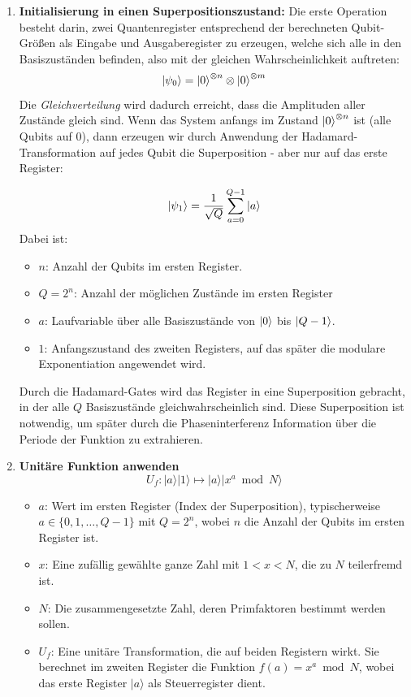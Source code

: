 \begin{enumerate}
    \item \textbf{Initialisierung in einen Superpositionszustand:} 
    Die erste Operation besteht darin, zwei Quantenregister entsprechend der berechneten Qubit-Größen als Eingabe und Ausgaberegister zu erzeugen, welche sich alle in den Basiszuständen befinden, also mit der gleichen Wahrscheinlichkeit auftreten:
\[
\ket{\psi_0} = \ket{0}^{\otimes n} \otimes \ket{0}^{\otimes m}
\]
    Die \textit{Gleichverteilung} wird dadurch erreicht, dass die Amplituden aller Zustände gleich sind. Wenn das System anfangs im Zustand $\ket{0}^{\otimes n}$ ist (alle Qubits auf 0), dann erzeugen wir durch Anwendung der Hadamard-Transformation auf jedes Qubit die Superposition - aber nur auf das erste Register:

$$
\ket{\psi_1} = \frac{1}{\sqrt{Q}} \sum_{a=0}^{Q-1} \ket{a}
$$
Dabei ist:
  \begin{itemize}
    \item \( n \): Anzahl der Qubits im ersten Register.
    \item \( Q = 2^n \): Anzahl der möglichen Zustände im ersten Register
    \item \( a \): Laufvariable über alle Basiszustände von \( \ket{0} \) bis \( \ket{Q-1} \).
    \item \( 1 \): Anfangszustand des zweiten Registers, auf das später die modulare Exponentiation angewendet wird.
  \end{itemize}

  Durch die Hadamard-Gates wird das Register in eine Superposition gebracht, in der alle \( Q \) Basiszustände gleichwahrscheinlich sind. Diese Superposition ist notwendig, um später durch die Phaseninterferenz Information über die Periode der Funktion zu extrahieren.\\
 \item \textbf{Unitäre Funktion anwenden} 
\[
U_f \colon |a\rangle|1\rangle \mapsto |a\rangle|x^a \bmod N\rangle
\]
\begin{itemize}
    \item \textbf{\( a \)}: Wert im ersten Register (Index der Superposition), typischerweise \( a \in \{0, 1, \dotsc, Q-1\} \) mit \( Q = 2^n \), wobei \( n \) die Anzahl der Qubits im ersten Register ist.
    \item \textbf{\( x \)}: Eine zufällig gewählte ganze Zahl mit \( 1 < x < N \), die zu \( N \) teilerfremd ist.
    \item \textbf{\( N \)}: Die zusammengesetzte Zahl, deren Primfaktoren bestimmt werden sollen.
    \item \textbf{\( U_f \)}: Eine unitäre Transformation, die auf beiden Registern wirkt. Sie berechnet im zweiten Register die Funktion \( f(a) = x^a \bmod N \), wobei das erste Register \( |a\rangle \) als Steuerregister dient.
\end{itemize}


\end{enumerate}
